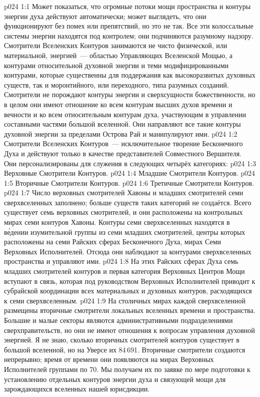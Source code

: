 \vs p024 1:1 Может показаться, что огромные потоки мощи пространства и контуры энергии духа действуют автоматически; может выглядеть, что они функционируют без помех или препятствий, но это не так. Все эти колоссальные системы энергии находятся под контролем; они подчиняются разумному надзору. Смотрители Вселенских Контуров занимаются не чисто физической, или материальной, энергией~--- областью Управляющих Вселенской Мощью, а контурами относительной духовной энергии и теми модифицированными контурами, которые существенны для поддержания как высокоразвитых духовных существ, так и моронтийного, или переходного, типа разумных созданий. Смотрители не порождают контуры энергии и сверхсущности божественности, но в целом они имеют отношение ко всем контурам высших духов времени и вечности и ко всем относительным контурам духа, участвующим в управлении составными частями большой вселенной. Они направляют все такие контуры духовной энергии за пределами Острова Рай и манипулируют ими.
\vs p024 1:2 \pc Смотрители Вселенских Контуров~--- исключительное творение Бесконечного Духа и действуют только в качестве представителей Совместного Вершителя. Они персонализированы для служения в следующих четырёх категориях:
\vs p024 1:3 Верховные Смотрители Контуров.
\vs p024 1:4 Младшие Смотрители Контуров.
\vs p024 1:5 Вторичные Смотрители Контуров.
\vs p024 1:6 Третичные Смотрители Контуров.
\vs p024 1:7 \pc Число верховных смотрителей Хавоны и младших смотрителей семи сверхвселенных заполнено; больше существ таких категорий не создаётся. Всего существует семь верховных смотрителей, и они расположены на контрольных мирах семи контуров Хавоны. Контуры семи сверхвселенных находятся в в\'едении изумительной группы из семи младших смотрителей, центры которых расположены на семи Райских сферах Бесконечного Духа, мирах Семи Верховных Исполнителей. Отсюда они наблюдают за контурами сверхвселенных пространства и управляют ими.
\vs p024 1:8 На этих Райских сферах Духа семь младших смотрителей контуров и первая категория Верховных Центров Мощи вступают в связь, которая под руководством Верховных Исполнителей приводит к субрайской координации всех материальных и духовных контуров, расходящихся к семи сверхвселенным.
\vs p024 1:9 На столичных мирах каждой сверхвселенной размещены вторичные смотрители локальных вселенных времени и пространства. Большие и малые секторы являются административными подразделениями сверхправительств, но они не имеют отношения к вопросам управления духовной энергией. Я не знаю, сколько вторичных смотрителей контуров существует в большой вселенной, но на Уверсе их 84\,691. Вторичные смотрители создаются непрерывно; время от времени они появляются на мирах Верховных Исполнителей группами по 70. Мы получаем их по заявке по мере подготовки к установлению отдельных контуров энергии духа и связующей мощи для зарождающихся вселенных нашей юрисдикции.

